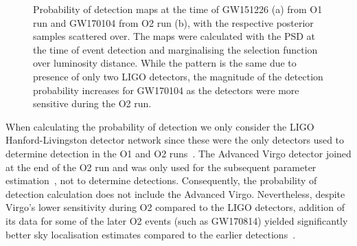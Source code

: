 \documentclass[usenatbib,useAMS]{mnras}
\begin{document}
% 
\begin{figure}
  \centering
	\hfill
    \caption{Probability of detection maps at the time of GW151226 (a) from O1
    run and GW170104 from O2 run (b), with the respective posterior samples scattered
    over. The maps were calculated with the \ac{PSD} at the time of event
    detection and marginalising the selection function over luminosity distance.
    While the pattern is the same due to presence of only two LIGO detectors,
    the magnitude of the detection probability increases for GW170104 as the
    detectors were more sensitive during the O2 run.}
	\label{fig:instantProb}
\end{figure}

% 
When calculating the probability of detection we only consider
the LIGO Hanford-Livingston detector network since these were
the only detectors used to determine detection in the O1 and O2
runs~\citep{O1O2catalog}. The Advanced Virgo detector joined at the
end of the O2 run and was only used for the subsequent parameter
estimation~\citep{Virgo}, not to determine detections.
Consequently, the probability of detection calculation does not include the
Advanced Virgo. Nevertheless, despite Virgo's lower sensitivity during O2
compared to the LIGO detectors, addition of its data for some of the later O2
events (such as GW170814) yielded significantly better sky localisation
estimates compared to the earlier detections~\citep{GW170814}.
\end{document}
